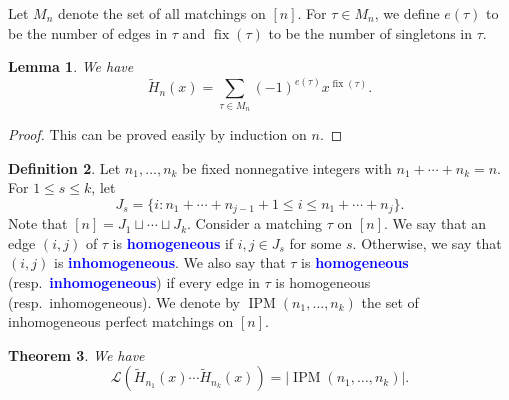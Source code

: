 \documentclass[oneside]{book}
\numberwithin{equation}{section}
\newtheorem{thm}{Theorem}[section]
\newtheorem{lem}[thm]{Lemma}
\theoremstyle{definition}
\newtheorem{defn}[thm]{Definition}
\newcommand\IPM{\operatorname{IPM}}
\newcommand\fix{\operatorname{fix}}
\newcommand\LL{\mathcal{L}}
\renewcommand\emph[1]{\textcolor{blue}{\bf #1}}
\begin{document}
Let \( M_n \) denote the set of all matchings on \( [n] \). For
\( \tau\in M_n \), we define \( e(\tau) \) to be the number of edges
in \( \tau \) and \( \fix(\tau) \) to be the number of singletons in
\( \tau \).

\begin{lem}\label{lem:10}
  We have
  \[
    \widetilde{H}_n(x) = \sum_{\tau\in M_n} (-1)^{e(\tau)} x^{\fix(\tau)}.
  \]
\end{lem}

\begin{proof}
  This can be proved easily by induction on \( n \).
\end{proof}

\begin{defn}\label{def:10}
  Let \( n_1,\dots,n_k \) be fixed nonnegative integers with
\( n_1 + \cdots + n_k = n \). For \( 1\le s\le k \), let
\begin{equation}\label{eq:81}
  J_s = \{ i: n_1 + \cdots + n_{j-1}+1 \le i\le n_1 + \cdots + n_j\}.
\end{equation}
Note that \( [n] = J_1 \sqcup \cdots \sqcup J_k \). Consider a
matching \( \tau \) on \( [n] \). We say that an edge \( (i,j) \) of
\( \tau \) is \emph{homogeneous} if \( i,j\in J_s \) for some \( s \).
Otherwise, we say that \( (i,j) \) is \emph{inhomogeneous}. We also
say that \( \tau \) is \emph{homogeneous} (resp.~\emph{inhomogeneous})
if every edge in \( \tau \) is homogeneous (resp.~inhomogeneous). We
denote by \( \IPM(n_1,\dots,n_k) \) the set of inhomogeneous perfect
matchings on \( [n] \).
\end{defn}


\begin{thm}
  We have
\[
  \LL(\widetilde{H}_{n_1}(x)\cdots \widetilde{H}_{n_k}(x))
  = |\IPM(n_1,\dots,n_k)|.
\]
\end{thm}
\end{document}

